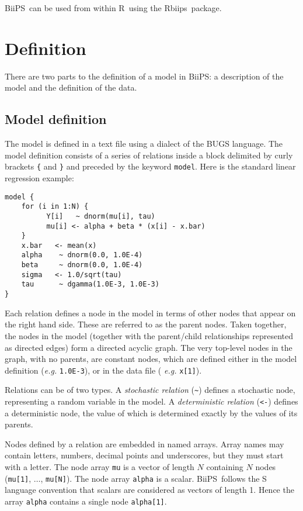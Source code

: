 \documentclass[11pt, a4paper, titlepage]{report}
\newcommand{\biips}{\textsf{BiiPS}}
\newcommand{\rbiips}{\textsf{Rbiips}}
\newcommand{\R}{\textsf{R}}
\begin{document}
\biips\ can be used from within \R\ using the \rbiips\ package.

\section{Definition}

There are two parts to the definition of a model in \biips: a
description of the model and the definition of the data.

\subsection{Model definition}

The model is defined in a text file using a dialect of the
BUGS language.  The model definition consists of a series of
relations inside a block delimited by curly brackets \verb+{+ and
\verb+}+ and preceded by the keyword \verb+model+. Here is the standard
linear regression example:

\begin{verbatim}
model {
    for (i in 1:N) {
          Y[i]   ~ dnorm(mu[i], tau)
          mu[i] <- alpha + beta * (x[i] - x.bar)
    }
    x.bar   <- mean(x)
    alpha    ~ dnorm(0.0, 1.0E-4)
    beta     ~ dnorm(0.0, 1.0E-4)
    sigma   <- 1.0/sqrt(tau)
    tau      ~ dgamma(1.0E-3, 1.0E-3)
}
\end{verbatim}

Each relation defines a node in the model in terms of other nodes that
appear on the right hand side. These are referred to as the parent
nodes. Taken together, the nodes in the model (together with the
parent/child relationships represented as directed edges) form a
directed acyclic graph. The very top-level nodes in the graph, with no
parents, are constant nodes, which are defined either in the model
definition ({\em e.g.}  \verb+1.0E-3+), or in the data file ({\em
  e.g.}  \verb+x[1]+).

Relations can be of two types. A {\em stochastic relation} (\verb+~+)
defines a stochastic node, representing a random variable in the
model. A {\em deterministic relation} (\verb+<-+) defines a
deterministic node, the value of which is determined exactly by the
values of its parents.

Nodes defined by a relation are embedded in named arrays. Array names may
contain letters, numbers, decimal points and underscores, but they must
start with a letter.  The node array \verb+mu+ is a vector of length
$N$ containing $N$ nodes (\verb+mu[1]+, $\ldots$, \verb+mu[N]+). The
node array \verb+alpha+ is a scalar.  \biips\ follows the S language
convention that scalars are considered as vectors of length 1. Hence
the array \verb+alpha+ contains a single node \verb+alpha[1]+.
\end{document}
